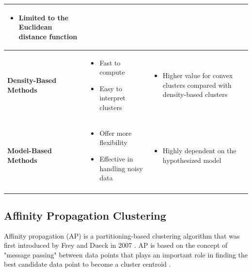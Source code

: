 \begin{table}[!h]
\begin{tabularx}{\linewidth}{p{3cm} p{5.5cm} p{5.5cm}}
\begin{itemize}[*,nosep,leftmargin=0.2cm]
    \item Limited to the Euclidean distance function
\end{itemize}
\tabularnewline \hline
\vfill
 \textbf{Density-Based Methods}
& 
\begin{itemize}[*,nosep,leftmargin=0.2cm]
    \item Fast to compute
    \item Easy to interpret clusters %
\end{itemize}
 &       
\begin{itemize}[*,nosep,leftmargin=0.2cm]
    \item Higher value for convex clusters compared with density-based clusters
\end{itemize}
\tabularnewline \hline
\vfill
 \textbf{Model-Based Methods}
& 
\begin{itemize}[*,nosep,leftmargin=0.2cm]
    \item Offer more flexibility
    \item Effective in handling noisy data            
\end{itemize}
 &       
\begin{itemize}[*,nosep,leftmargin=0.2cm]
    \item Highly dependent on the hypothesized model
\end{itemize} 
\tabularnewline \hline
\vfill
\end{tabularx}
\end{table}



\subsection{Affinity Propagation Clustering}

Affinity propagation (AP) is a partitioning-based clustering algorithm that was first introduced by Frey and Dueck in 2007 \cite{frey2006mixture}. AP is based on the concept of "message passing" between data points that plays an important role in finding the best candidate data point to become a cluster centroid \cite{frey2007clustering, jiang2019exemplar}. 



